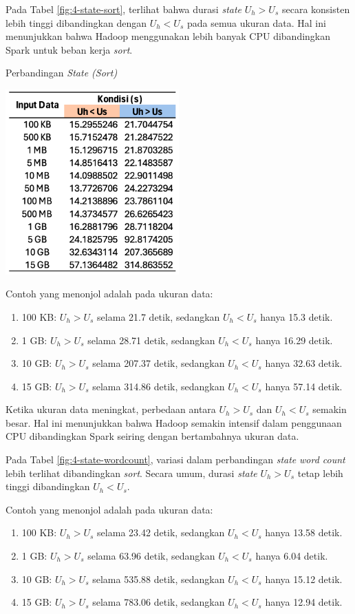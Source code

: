 Pada Tabel \ref{fig:4-state-sort}, terlihat bahwa durasi \textit{state} $U_h > U_s$ secara konsisten lebih tinggi dibandingkan dengan $U_h < U_s$ pada semua ukuran data. Hal ini menunjukkan bahwa Hadoop menggunakan lebih banyak CPU dibandingkan Spark untuk beban kerja \textit{sort}.

\begin{table}[h]
  \centering
  \caption{Perbandingan \textit{State (Sort)}}
  \includegraphics[width=0.5\textwidth]{figures/ch04/4-kondisi-sort}
  \label{fig:4-state-sort}
\end{table}

Contoh yang menonjol adalah pada ukuran data:
\begin{enumerate}
	\item 100 KB: $U_h > U_s$ selama 21.7 detik, sedangkan $U_h < U_s$ hanya 15.3 detik.
	\item 1 GB: $U_h > U_s$ selama 28.71 detik, sedangkan $U_h < U_s$ hanya 16.29 detik.
	\item 10 GB: $U_h > U_s$ selama 207.37 detik, sedangkan $U_h < U_s$ hanya 32.63 detik.
	\item 15 GB: $U_h > U_s$ selama 314.86 detik, sedangkan $U_h < U_s$ hanya 57.14 detik.
\end{enumerate}

Ketika ukuran data meningkat, perbedaan antara $U_h > U_s$ dan $U_h < U_s$ semakin besar. Hal ini menunjukkan bahwa Hadoop semakin intensif dalam penggunaan CPU dibandingkan Spark seiring dengan bertambahnya ukuran data.

Pada Tabel \ref{fig:4-state-wordcount}, variasi dalam perbandingan \textit{state} \textit{word count} lebih terlihat dibandingkan  \textit{sort}. Secara umum, durasi \textit{state} $U_h > U_s$ tetap lebih tinggi dibandingkan $U_h < U_s$.

Contoh yang menonjol adalah pada ukuran data:
\begin{enumerate}
	\item 100 KB: $U_h > U_s$ selama 23.42 detik, sedangkan $U_h < U_s$ hanya 13.58 detik.
	\item 1 GB: $U_h > U_s$ selama 63.96 detik, sedangkan $U_h < U_s$ hanya 6.04 detik.
	\item 10 GB: $U_h > U_s$ selama 535.88 detik, sedangkan $U_h < U_s$ hanya 15.12 detik.
	\item 15 GB: $U_h > U_s$ selama 783.06 detik, sedangkan $U_h < U_s$ hanya 12.94 detik.
\end{enumerate}


